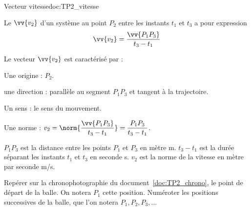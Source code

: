 \begin{doc}{Vecteur vitesse}{doc:TP2_vitesse}
  \begin{importants}
    Le  $\vv{v_2}$ d'un système au point $P_2$ entre les instants $t_1$ et $t_3$ a pour expression
    \begin{equation*}
      \vv{v_2} = \frac{\vv{P_1 P_3}}{t_3 - t_1}
    \end{equation*}
  \end{importants}
  
  Le vecteur $\vv{v_2}$ est caractérisé par :
  \vspace*{-8pt}
  \begin{multicols}{2}
  \begin{listePoints}
    \item Une origine : $P_2$.
    \item une direction : parallèle au segment $P_1 P_3$ et tangent à la trajectoire.
    \item Un sens : le sens du mouvement.
    \item Une norme : $v_2 
    = \displaystyle \norm{\frac{\vv{P_1 P_3}}{t_3 - t_1}}
    = \displaystyle \frac{P_1 P_3}{t_3 - t_1}$.
  \end{listePoints}
  \end{multicols}
  
  $P_1 P_3$ est la distance entre les points $P_1$ et $P_3$ en mètre \unit{\m}.
  $t_3 - t_1$ est la durée séparant les instants $t_1$ et $t_3$ en seconde \unit{\s}.
  $v_2$ est la norme de la vitesse en mètre par seconde \unit{\m/\s}.
\end{doc}


\vspace*{-4pt}

%

%



%
\mesure
Repérer sur la chronophotographie du document~\ref{doc:TP2_chrono}, le point de départ de la balle.
On notera $P_1$ cette position.
Numéroter les positions successives de la balle, que l'on notera $P_1, P_2, P_3, \ldots$

